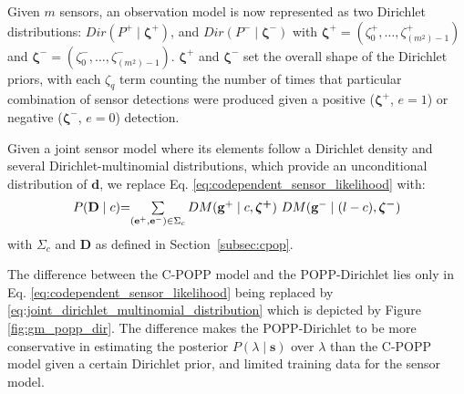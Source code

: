 Given $m$ sensors, an observation model is now represented as two Dirichlet distributions: $Dir(P^+ \mid \boldsymbol{\zeta^+})$, and $Dir(P^- \mid \boldsymbol{\zeta^-})$ with $\boldsymbol{\zeta^+} = (\zeta^+_0, \ldots, \zeta^+_{(m^2)-1})$ and $\boldsymbol{\zeta^-} = (\zeta^-_0, \ldots, \zeta^-_{(m^2)-1})$. $\boldsymbol{\zeta^+}$ and $\boldsymbol{\zeta^-}$ set the overall shape of the Dirichlet priors, with each $\zeta_q$ term counting the number of times that particular combination of sensor detections were produced given a positive ($\boldsymbol{\zeta^+}$, $e=1$) or negative ($\boldsymbol{\zeta^-}$, $e=0$) detection.

Given a joint sensor model where its elements follow a Dirichlet density and several Dirichlet-multinomial distributions, which provide an unconditional distribution of $\mathbf{d}$, we replace Eq. \ref{eq:codependent_sensor_likelihood} with:  
\begin{equation}
	\label{eq:joint_dirichlet_multinomial_distribution}
    \begin{tabular}{r@{=}l}
		$P(\mathbf{D} \mid c)$ & $\sum\limits_{(\mathbf{e}^+, \mathbf{e}^-) \in \Sigma_c} DM(\mathbf{g}^+ \mid c, \boldsymbol{\zeta^+}) ~ DM(\mathbf{g}^- \mid (l - c), \boldsymbol{\zeta^-})$
	\end{tabular}
\end{equation}
\noindent with $\Sigma_c$ and $\mathbf{D}$ as defined in Section~\ref{subsec:cpop}.

The difference between the C-POPP model and the POPP-Dirichlet lies only in Eq. \ref{eq:codependent_sensor_likelihood} being replaced by \ref{eq:joint_dirichlet_multinomial_distribution} which is depicted by Figure \ref{fig:gm_popp_dir}. The difference makes the POPP-Dirichlet to be more conservative in estimating the posterior $P(\lambda \mid \mathbf{s})$ over $\lambda$ than the C-POPP model given a certain Dirichlet prior, and limited training data for the sensor model.


